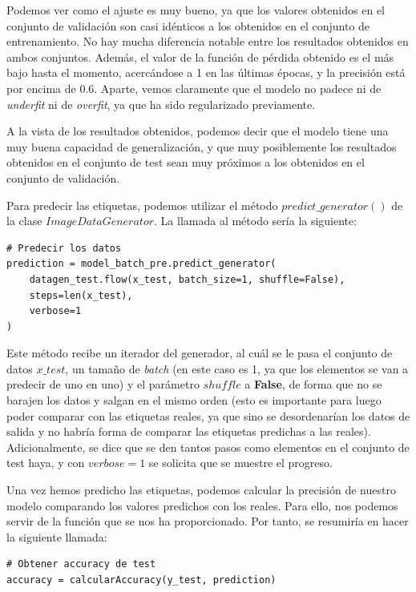 \documentclass[11pt,a4paper]{article}
\begin{document}
Podemos ver como el ajuste es muy bueno, ya que los valores obtenidos en el conjunto de validación
son casi idénticos a los obtenidos en el conjunto de entrenamiento. No hay mucha diferencia notable
entre los resultados obtenidos en ambos conjuntos. Además, el valor de la función de pérdida obtenido es el más
bajo hasta el momento, acercándose a 1 en las últimas épocas, y la precisión está por encima de 0.6.
Aparte, vemos claramente que el modelo no padece ni de \textit{underfit} ni de \textit{overfit}, ya que
ha sido regularizado previamente.

A la vista de los resultados obtenidos, podemos decir que el modelo tiene una muy buena capacidad
de generalización, y que muy posiblemente los resultados obtenidos en el conjunto de test sean
muy próximos a los obtenidos en el conjunto de validación.

Para predecir las etiquetas, podemos utilizar el método $predict\_generator()$ de la clase
$ImageDataGenerator$. La llamada al método sería la siguiente:

\begin{lstlisting}
# Predecir los datos
prediction = model_batch_pre.predict_generator(
    datagen_test.flow(x_test, batch_size=1, shuffle=False),
    steps=len(x_test),
    verbose=1
)
\end{lstlisting}

Este método recibe un iterador del generador, al cuál se le pasa el conjunto de datos $x\_test$, un 
tamaño de \textit{batch} (en este caso es 1, ya que los elementos se van a predecir de uno en uno) y
el parámetro $shuffle$ a \textbf{False}, de forma que no se barajen los datos y salgan en el mismo orden
(esto es importante para luego poder comparar con las etiquetas reales, ya que sino se desordenarían
los datos de salida y no habría forma de comparar las etiquetas predichas a las reales). Adicionalmente,
se dice que se den tantos pasos como elementos en el conjunto de test haya, y con $verbose = 1$ se solicita
que se muestre el progreso.

Una vez hemos predicho las etiquetas, podemos calcular la precisión de nuestro modelo comparando los valores
predichos con los reales. Para ello, nos podemos servir de la función que se nos ha proporcionado. Por tanto,
se resumiría en hacer la siguiente llamada:

\begin{lstlisting}
# Obtener accuracy de test
accuracy = calcularAccuracy(y_test, prediction)
\end{lstlisting}
\end{document}
